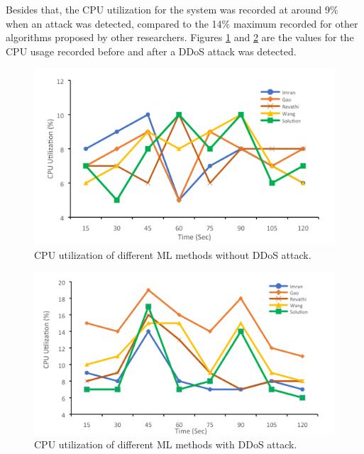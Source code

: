 \documentclass[a4paper, 12pt]{article}
\begin{document}
Besides that, the CPU utilization for the system was recorded at around 9\% when an attack was detected, compared to the 14\% maximum recorded for other algorithms proposed by other researchers. Figures \ref{fig:cpu1} and \ref{fig:cpu2} are the values for the CPU usage recorded before and after a DDoS attack was detected. \cite{3} 

\begin{figure}[H]
    \centering
    \includegraphics[width=0.7\linewidth]{image-cpu1.png}
    \caption{CPU utilization of different ML methods without DDoS attack. \protect{}}
    \label{fig:cpu1}
\end{figure}

\begin{figure}[H]
    \centering
    \includegraphics[width=0.7\linewidth]{image-cpu2.png}
    \caption{CPU utilization of different ML methods with DDoS attack. \protect{}}
    \label{fig:cpu2}
\end{figure}
\end{document}
